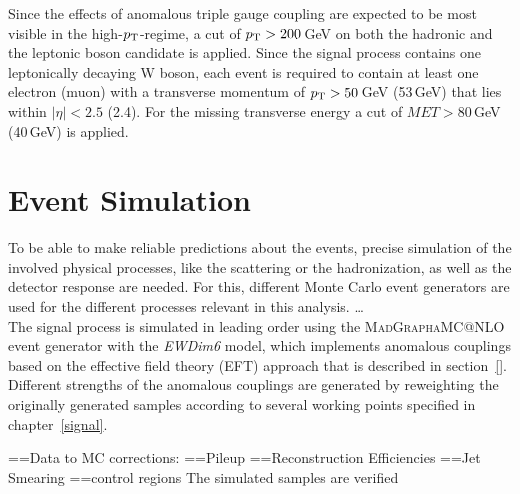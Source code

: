 \noindent Since the effects of anomalous triple gauge coupling are expected to be most visible in the high-$p_{\rm T}$-regime, a cut of $p_{\rm T}>200$\,GeV on both the hadronic and the leptonic boson candidate is applied.
Since the signal process contains one leptonically decaying W boson, each event is required to contain at least one electron (muon) with a transverse momentum of $p_{\rm T}>50$\,GeV (53\,GeV) that lies within $|\eta|<2.5$ (2.4). For the missing transverse energy a cut of $MET>80$\,GeV (40\,GeV) is applied. 
\section{Event Simulation}
\label{sec:MC}
To be able to make reliable predictions about the events, precise simulation of the involved physical processes, like the scattering or the hadronization, as well as the detector response are needed. For this, different Monte Carlo event generators are used for the different processes relevant in this analysis.
\dots \\
The signal process is simulated in leading order using the \textsc{MadGraph\textunderscore aMC@NLO} event generator with the \textit{EWDim6} model\cite{madgraph}, which implements anomalous couplings based on the effective field theory (EFT) approach that is described in section~\ref{}. Different strengths of the anomalous couplings are generated by reweighting the originally generated samples according to several working points specified in chapter~\ref{signal}.


=={Data to MC corrections:}
=={Pileup}
=={Reconstruction Efficiencies}
=={Jet Smearing}
=={control regions}
The simulated samples are verified 
